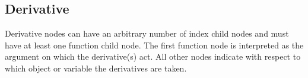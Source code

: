 
\subsection{Derivative}

Derivative nodes can have an arbitrary number of index child nodes and
must have at least one function child node. The first function node is
interpreted as the argument on which the derivative(s) act. All other
nodes indicate with respect to which object or variable the
derivatives are taken.
